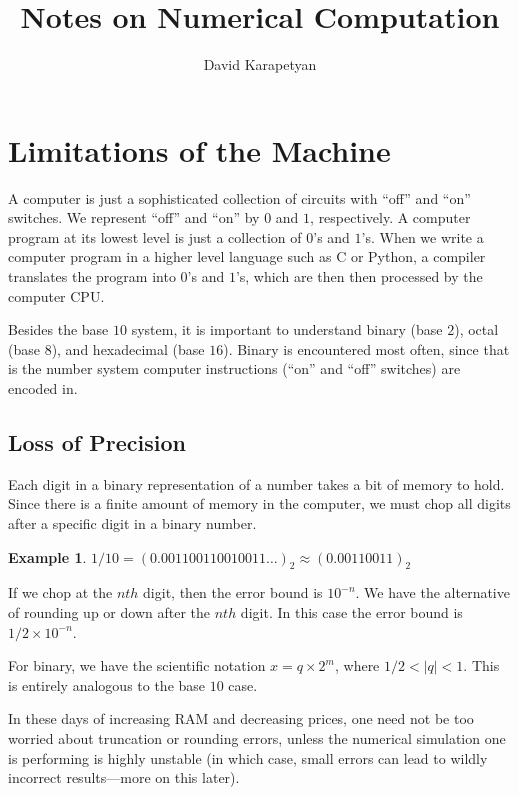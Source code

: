 \documentclass[12pt]{article}
\theoremstyle{plain}
\theoremstyle{definition}
\newtheorem*{example}{Example}
\theoremstyle{remark}
\numberwithin{equation}{section}  %
\begin{document}
\title{Notes on Numerical Computation }
\author{David Karapetyan}
\date{}
\maketitle
\newpage
\setcounter{tocdepth}{2}
\tableofcontents

\newpage
\section{Limitations of the Machine}
A computer is just a sophisticated collection of circuits
with ``off'' and ``on'' switches. We represent ``off'' and
``on'' by $0$ and $1$, respectively. A computer program 
at its lowest level is just a collection of $0$'s and $1$'s.
When we write a computer program in a higher level language such as C
or Python, a compiler translates the program into $0$'s and $1$'s,
which are then then processed by the computer CPU.

Besides the base $10$ system, it is important to understand binary (base $2$),
octal (base $8$), and hexadecimal (base $16$). Binary is encountered most often,
since that is the number system computer instructions (``on'' and ``off'' switches)
are encoded in.

\subsection{Loss of Precision}
Each digit in a binary representation of a number takes a bit of memory to hold.
Since there is a finite amount of memory in the computer, we must chop all digits
after a specific digit in a binary number. 
\begin{example}
$1/10 = (0.001100110010011\ldots)_2 \approx (0.00110011)_2$
\end{example}
If we chop at the $nth$ digit, then the error bound is $10^{-n}$.
We have the alternative of rounding up or down after the $nth$ digit. 
In this case the error bound is $1/2 \times 10^{-n}$.

For binary, we have the scientific notation $x = q \times 2^{m}$, where
$1/2 < |q| < 1$. This is entirely analogous to the base $10$ case.

In these days of increasing RAM and decreasing prices, one need not be too worried
about truncation or rounding errors, unless the numerical simulation one is performing
is highly unstable (in which case, small errors can lead to wildly incorrect results---more
on this later).
\end{document}
